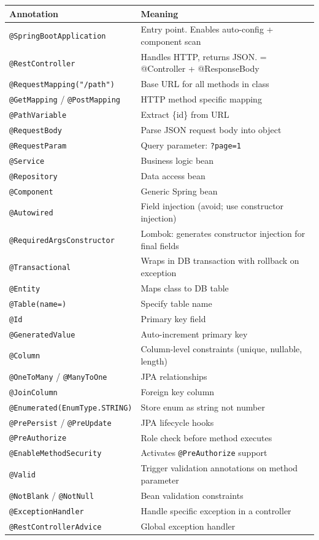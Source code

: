 \documentclass[12pt,a4paper]{report}
\newcommand{\code}[1]{\texttt{\textcolor{keywordblue}{#1}}}
\begin{document}
\begin{tabularx}{\textwidth}{@{}lX@{}}
\toprule
\textbf{Annotation} & \textbf{Meaning} \\
\midrule
\code{@SpringBootApplication} & Entry point. Enables auto-config + component scan \\
\code{@RestController} & Handles HTTP, returns JSON. = @Controller + @ResponseBody \\
\code{@RequestMapping("/path")} & Base URL for all methods in class \\
\code{@GetMapping} / \code{@PostMapping} & HTTP method specific mapping \\
\code{@PathVariable} & Extract \{id\} from URL \\
\code{@RequestBody} & Parse JSON request body into object \\
\code{@RequestParam} & Query parameter: \code{?page=1} \\
\code{@Service} & Business logic bean \\
\code{@Repository} & Data access bean \\
\code{@Component} & Generic Spring bean \\
\code{@Autowired} & Field injection (avoid; use constructor injection) \\
\code{@RequiredArgsConstructor} & Lombok: generates constructor injection for final fields \\
\code{@Transactional} & Wraps in DB transaction with rollback on exception \\
\code{@Entity} & Maps class to DB table \\
\code{@Table(name=)} & Specify table name \\
\code{@Id} & Primary key field \\
\code{@GeneratedValue} & Auto-increment primary key \\
\code{@Column} & Column-level constraints (unique, nullable, length) \\
\code{@OneToMany} / \code{@ManyToOne} & JPA relationships \\
\code{@JoinColumn} & Foreign key column \\
\code{@Enumerated(EnumType.STRING)} & Store enum as string not number \\
\code{@PrePersist} / \code{@PreUpdate} & JPA lifecycle hooks \\
\code{@PreAuthorize} & Role check before method executes \\
\code{@EnableMethodSecurity} & Activates \code{@PreAuthorize} support \\
\code{@Valid} & Trigger validation annotations on method parameter \\
\code{@NotBlank} / \code{@NotNull} & Bean validation constraints \\
\code{@ExceptionHandler} & Handle specific exception in a controller \\
\code{@RestControllerAdvice} & Global exception handler \\
\bottomrule
\end{tabularx}
\end{document}
